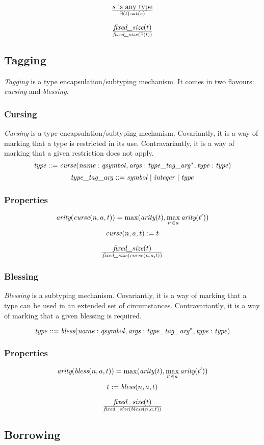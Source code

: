 \documentclass[a4paper]{report}
\newcommand\arity{{\ensuremath\textit{arity}}}
\newcommand\fixedsize{{\ensuremath\textit{fixed\_size}}}
\newcommand\tyBless{{\ensuremath\textit{bless}}}
\newcommand\tyCurse{{\ensuremath\textit{curse}}}
\begin{document}
$${s \textrm{ is any type}} \over \exists(t) := t(s)$$

$$\fixedsize(t) \over \fixedsize(\exists(t))$$

\subsection{Tagging}
\emph{Tagging} is a type encapsulation/subtyping mechanism.
It comes in two flavours: \emph{cursing} and \emph{blessing}.

\subsubsection{Cursing}
\emph{Cursing} is a type encapsulation/subtyping mechanism.
Covariantly, it is a way of marking that a type is restricted in its use.
Contravariantly, it is a way of marking that a given restriction does not apply.
$$
\it type ::= \tyCurse(name : qsymbol, args : type\_tag\_arg^*, type : type)
$$
$$
\it type\_tag\_arg ::= symbol \;|\; integer \;|\; type
$$

\subsubsection*{Properties}
$$
\arity(\tyCurse(n,a,t)) = \max(\arity(t), \max_{t' \in a} \arity(t'))
$$
$$
\tyCurse(n,a,t) := t
$$

$$\fixedsize(t) \over \fixedsize(\tyCurse(n,a,t))$$

\subsubsection{Blessing}
\emph{Blessing} is a subtyping mechanism.
Covariantly, it is a way of marking that a type can be used in an
extended set of circumstances.
Contravariantly, it is a way of marking that a given blessing is required.

$$
\it type ::= \tyBless(name : qsymbol, args : type\_tag\_arg^*, type : type)
$$

\subsubsection*{Properties}
$$
\arity(\tyBless(n,a,t)) = \max(\arity(t), \max_{t' \in a} \arity(t'))
$$
$$
t := \tyBless(n,a,t)
$$

$$\fixedsize(t) \over \fixedsize(\tyBless(n,a,t))$$

\subsection{Borrowing}
\end{document}
